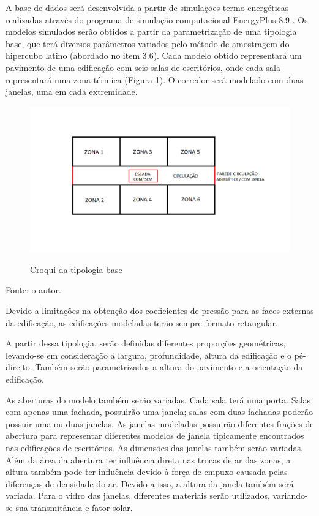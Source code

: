 \documentclass[brazil,hardcopy,openany,a5paper]{ufscthesis}
\begin{document}
		A base de dados será desenvolvida a partir de simulações termo-energéticas realizadas através do programa de simulação computacional EnergyPlus 8.9 \cite{EnergyPlus2018}. Os modelos simulados serão obtidos a partir da parametrização de uma tipologia base, que terá diversos parâmetros variados pelo método de amostragem do hipercubo latino (abordado no item 3.6). Cada modelo obtido representará um pavimento de uma edificação com seis salas de escritórios, onde cada sala representará uma zona térmica (Figura \ref{fig:croqui}). O corredor será modelado com duas janelas, uma em cada extremidade.
		
		\begin{figure}[h]
			\centering
			\caption{Croqui da tipologia base}
			\includegraphics[width=1\linewidth]{img/CROQUI.png}
			\label{fig:croqui}
		\end{figure}
		\begin{flushleft}
			Fonte: o autor.
		\end{flushleft}
		
		Devido a limitações na obtenção dos coeficientes de pressão para as faces externas da edificação, as edificações modeladas terão sempre formato retangular.
		
		A partir dessa tipologia, serão definidas diferentes proporções geométricas, levando-se em consideração a largura, profundidade, altura da edificação e o pé-direito. Também serão parametrizados a altura do pavimento e a orientação da edificação.
		
		As aberturas do modelo também serão variadas. Cada sala terá uma porta. Salas com apenas uma fachada, possuirão uma janela; salas com duas fachadas poderão possuir uma ou duas janelas. As janelas modeladas possuirão diferentes frações de abertura para representar diferentes modelos de janela tipicamente encontrados nas edificações de escritórios. As dimensões das janelas também serão variadas. Além da área da abertura ter influência direta nas trocas de ar das zonas, a altura também pode ter influência devido à força de empuxo causada pelas diferenças de densidade do ar. Devido a isso, a altura da janela também será variada. Para o vidro das janelas, diferentes materiais serão utilizados, variando-se sua transmitância e fator solar.
		
\end{document}
